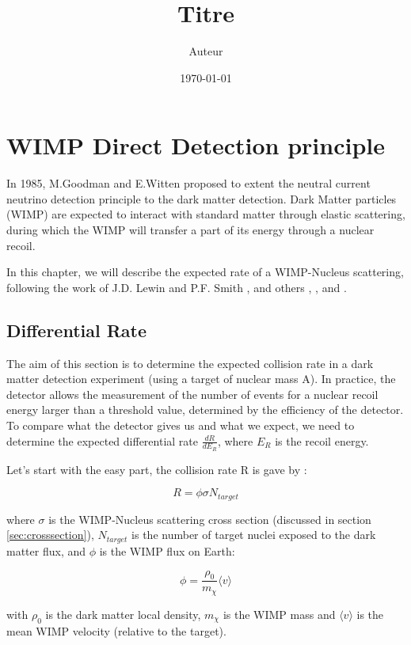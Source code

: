 \documentclass[a4paper, twoside, openany, 11pt]{book}
\title{Titre}
\author{Auteur}
\date\today
\begin{document}
\chapter[Ratecalculation]{WIMP Direct Detection principle}


In 1985, M.Goodman and E.Witten proposed to extent the neutral current neutrino detection principle to the dark matter detection. Dark Matter particles (WIMP) are expected to interact with standard matter through elastic scattering, during which the WIMP will transfer a part of its energy through a nuclear recoil.

In this chapter, we will describe the expected rate of a WIMP-Nucleus scattering, following the work of J.D. Lewin and P.F. Smith \cite{ArticleLewinSmith}, and others \cite{LectureArmengaud}, \cite{ArticleJungman}, \cite{ThesisMassoli} and \cite{ThesisKaixuan}.


\section{Differential Rate}
\label{sec:rate}

The aim of this section is to determine the expected collision rate in a dark matter detection experiment (using a target of nuclear mass A). In practice, the detector allows the measurement of the number of events for a nuclear recoil energy larger than a threshold value, determined by the efficiency of the detector. To compare what the detector gives us and what we expect, we need to determine the expected differential rate $\frac{dR}{dE_R}$, where $E_R$ is the recoil energy.

\medskip

Let's start with the easy part, the collision rate R is gave by : 

\begin{equation}
\label{eq:rate}
R = \phi \sigma N_{target}
\end{equation}

where 
$\sigma $ is the WIMP-Nucleus scattering cross section (discussed in section \ref{sec:crosssection}), $N_{target}$ is the number of target nuclei exposed to the dark matter flux, and $\phi$ is the WIMP flux on Earth: 

\begin{equation}
\label{eq:flux}
\phi=\frac{\rho_{0}}{m_{\chi}} \langle v \rangle
\end{equation}

with
$\rho_{0}$ is the dark matter local density, $m_{\chi}$ is the WIMP mass and $ \langle v \rangle $ is the mean WIMP velocity (relative to the target). 
\end{document}
